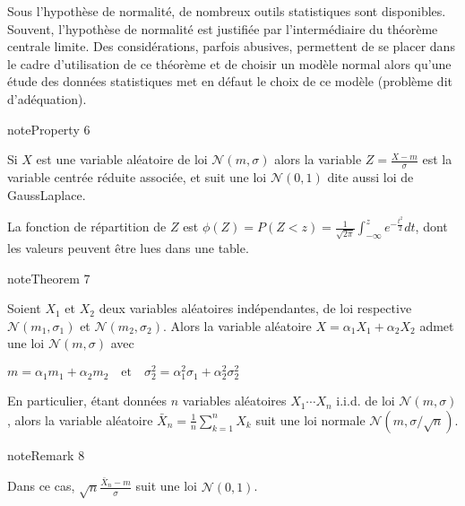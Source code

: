 \documentclass[letterpaper,10pt,english]{jupyterBook}
\begin{document}
\sphinxAtStartPar
Sous l’hypothèse de normalité, de nombreux outils statistiques sont disponibles. Souvent, l’hypothèse de normalité est justifiée par l’intermédiaire du théorème centrale limite. Des considérations, parfois abusives, permettent de se placer dans le cadre d’utilisation de ce théorème et de choisir un modèle normal alors qu’une étude des données statistiques met en défaut le choix de ce modèle (problème dit d’adéquation).
\label{elemstats:property-11}
\begin{sphinxadmonition}{note}{Property 6}



\sphinxAtStartPar
Si \(X\) est une variable aléatoire de loi \(\mathcal{N}(m,\sigma)\) alors la variable \(Z=\frac{X-m}{\sigma}\) est la variable centrée réduite associée, et suit une loi \(\mathcal{N}(0,1)\) dite aussi loi de Gauss\sphinxhyphen{}Laplace.
\end{sphinxadmonition}

\sphinxAtStartPar
La fonction de répartition de \(Z\) est \(\phi(Z) = P(Z<z) = \frac{1}{\sqrt{2\pi}}\int_{-\infty}^z e^{-\frac{t^2}{2}}dt\), dont les valeurs peuvent être lues dans une table.
\label{elemstats:theorem-12}
\begin{sphinxadmonition}{note}{Theorem 7}



\sphinxAtStartPar
Soient \(X_1\) et \(X_2\) deux variables aléatoires indépendantes, de loi respective \(\mathcal{N}(m_1,\sigma_1)\) et \(\mathcal{N}(m_2,\sigma_2)\). Alors la variable aléatoire \(X=\alpha_1X_1+\alpha_2X_2\) admet une loi \(\mathcal{N}(m,\sigma)\) avec

\sphinxAtStartPar
\(m = \alpha_1 m_1+\alpha_2 m_2\quad \textrm{et}\quad \sigma_2^2 = \alpha_1^2 \sigma_1+\alpha_2^2 \sigma_2^2\)

\sphinxAtStartPar
En particulier, étant données \(n\) variables aléatoires \(X_1\cdots X_n\) i.i.d. de loi \(\mathcal{N}(m,\sigma)\), alors la variable aléatoire \(\bar X_n = \frac1n \displaystyle\sum_{k=1}^nX_k\) suit une loi normale \(\mathcal{N}(m,\sigma/\sqrt{n})\).
\end{sphinxadmonition}
\label{elemstats:remark-13}
\begin{sphinxadmonition}{note}{Remark 8}



\sphinxAtStartPar
Dans ce cas, \(\sqrt{n}\frac{\bar X_n-m}{\sigma}\) suit une loi \(\mathcal{N}(0,1)\).
\end{sphinxadmonition}
\end{document}
